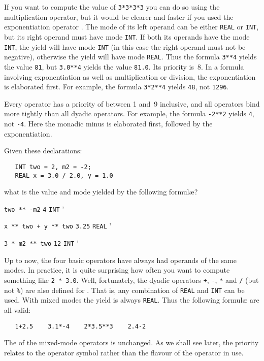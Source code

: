 If you want to compute the value of \verb|3*3*3*3| you can do so
using the multiplication operator, but it would be clearer and faster
if you used the exponentiation operator \ixtt{**}.  The mode of its
left operand can be either \verb|REAL| or \verb|INT|, but its right
operand must have mode \verb|INT|. If both its operands have the mode
\verb|INT|, the yield will have mode \verb|INT| (in this case the
right operand must not be negative), otherwise the yield will have
mode \verb|REAL|.  Thus the formula \verb|3**4| yields the value
\verb|81|, but \verb|3.0**4| yields the value \verb|81.0|.  Its
priority is~8.  In a formula involving exponentiation as well as
multiplication or division, the exponentiation is elaborated first.
For example, the formula \verb|3*2**4| yields \verb|48|, not
\verb|1296|.

Every  operator has a priority of
between 1 and~9 inclusive, and all
 operators bind more tightly than
all dyadic operators.  For example, the formula \verb|-2**2| yields
\verb|4|, not \verb|-4|.  Here the monadic minus is elaborated first,
followed by the exponentiation.

\begin{exercise}
\item Given these declarations:
\begin{verbatim}
   INT two = 2, m2 = -2;
   REAL x = 3.0 / 2.0, y = 1.0
\end{verbatim}
\noindent
what is the value and mode yielded by the following formul{\ae}?
\begin{subex}
\item \verb|two ** -m2| \subans \verb|4| \verb|INT|
'
\item \verb|x ** two + y ** two| \subans \verb|3.25| \verb|REAL|
'
\item \verb|3 * m2 ** two| \subans \verb|12| \verb|INT|
'
\end{subex}
\end{exercise}

Up to now, the four basic 
operators have always had operands of the same modes.  In practice,
it is quite surprising how often you want to compute something like
\verb|2 * 3.0|.  Well, fortunately, the dyadic operators \verb|+|,
\verb|-|, \verb|*| and \verb|/| (but not \verb|%|) are also defined
for .  That is, any combination of
\verb|REAL| and \verb|INT| can be used.  With mixed modes the yield
is always \verb|REAL|.  Thus the following formul{\ae} are all valid:
\begin{verbatim}
   1+2.5    3.1*-4    2*3.5**3    2.4-2
\end{verbatim}
\noindent
The  of the mixed-mode operators is unchanged. As we
shall see later, the priority relates to the operator symbol rather
than the flavour of the operator in use.

